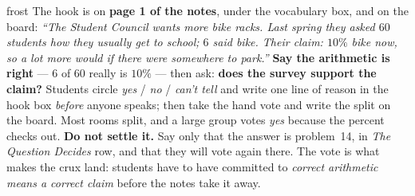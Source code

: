 \documentclass[10pt]{article}
\begin{document}
\boxguard
\begin{skillbox}{frost}
The hook is on \textbf{page 1 of the notes}, under the vocabulary box, and on the board:
\textit{``The Student Council wants more bike racks. Last spring they asked $60$ students how
they usually get to school; $6$ said bike. Their claim: $10\%$ bike now, so a lot more would
if there were somewhere to park.''} \textbf{Say the arithmetic is right} --- $6$ of $60$ really
is $10\%$ --- then ask: \textbf{does the survey support the claim?} Students circle
\emph{yes} / \emph{no} / \emph{can't tell} and write one line of reason in the hook box
\emph{before} anyone speaks; then take the hand vote and write the split on the board. Most
rooms split, and a large group votes \emph{yes} because the percent checks out.
\textbf{Do not settle it.} Say only that the answer is problem~14, in \emph{The Question
Decides} row, and that they will vote again there. The vote is what makes the crux land:
students have to have committed to \emph{correct arithmetic means a correct claim} before the
notes take it away.
\end{skillbox}
\end{document}
